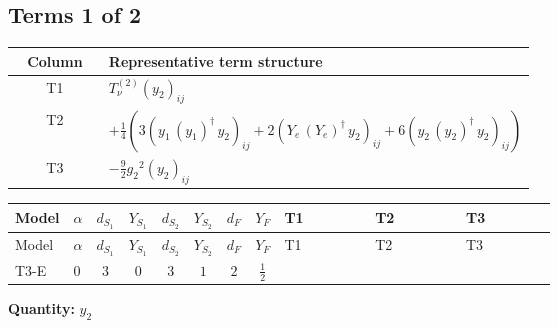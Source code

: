 \documentclass[8pt]{article}
\begin{document}
\begin{landscape}
\subsection*{Terms 1 of 2}
\begin{center}
\begin{tabular}{@{}c >{\raggedright\arraybackslash}p{0.82\linewidth}@{}}
\toprule
Column & Representative term structure \\
\midrule
T1 & \(\displaystyle T_{\nu}^{(2)} \left({y_2}\right)_{ij}\) \\
\midrule
T2 & \(\displaystyle +\frac{1}{4} (3 \left({y_1}\,\left({y_1}\right)^{\dagger}\,{y_2}\right)_{ij}+2 \left({Y_e}\,\left({Y_e}\right)^{\dagger}\,{y_2}\right)_{ij}+6 \left({y_2}\,\left({y_2}\right)^{\dagger}\,{y_2}\right)_{ij})\) \\
\midrule
T3 & \(\displaystyle -\frac{9}{2} {g_2}^2 \left({y_2}\right)_{ij}\) \\
\midrule
\bottomrule
\end{tabular}
\end{center}
\smallskip
\tiny
\begin{longtable}{@{}llcccccc >{\raggedright\arraybackslash}p{0.21\linewidth} >{\raggedright\arraybackslash}p{0.21\linewidth} >{\raggedright\arraybackslash}p{0.21\linewidth}@{}}
\toprule
Model & $\alpha$ & $d_{S_1}$ & $Y_{S_1}$ & $d_{S_2}$ & $Y_{S_2}$ & $d_F$ & $Y_F$ & T1 & T2 & T3 \\
\midrule
\endfirsthead
\toprule
Model & $\alpha$ & $d_{S_1}$ & $Y_{S_1}$ & $d_{S_2}$ & $Y_{S_2}$ & $d_F$ & $Y_F$ & T1 & T2 & T3 \\
\midrule
\endhead
T3-E & $0$ & $3$ & $0$ & $3$ & $1$ & $2$ & $\frac{1}{2}$ & \scriptsize\adjustbox{max width=\linewidth}{$\begin{gathered} T_{\nu}^{(2)} \left({y_2}\right)_{ij}\end{gathered}$} & \scriptsize\adjustbox{max width=\linewidth}{$\begin{gathered} +\frac{1}{4} (3 \left({y_1}\,\left({y_1}\right)^{\dagger}\,{y_2}\right)_{ij}+2 \left({Y_e}\,\left({Y_e}\right)^{\dagger}\,{y_2}\right)_{ij}+6 \left({y_2}\,\left({y_2}\right)^{\dagger}\,{y_2}\right)_{ij})\end{gathered}$} & \scriptsize\adjustbox{max width=\linewidth}{$\begin{gathered} -\frac{9}{2} {g_2}^2 \left({y_2}\right)_{ij}\end{gathered}$} \\
\midrule
\bottomrule
\end{longtable}
\clearpage
\noindent\textbf{Quantity: }$y_2$\par\smallskip

\end{landscape}
\end{document}
